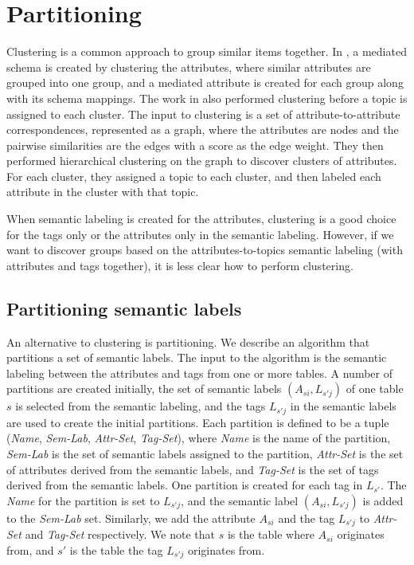\section{Partitioning}
\label{sec:Partitioning}

Clustering is a common approach to group similar items together. In \cite{ilprints851}, a mediated schema is created by clustering the attributes, where similar attributes are grouped into one group, and a mediated attribute is created for each group along with its schema mappings. The work in \cite{Smith2011Unity} also performed clustering before a topic is assigned to each cluster. The input to clustering is a set of attribute-to-attribute correspondences, represented as a graph, where the attributes are nodes and the pairwise similarities are the edges with a score as the edge weight. They then performed hierarchical clustering on the graph to discover clusters of attributes. For each cluster, they assigned a topic to each cluster, and then labeled each attribute in the cluster with that topic.

When semantic labeling is created for the attributes, clustering is a good choice for the tags only or the attributes only in the semantic labeling. However, if we want to discover groups based on the attributes-to-topics semantic labeling (with attributes and tags together), it is less clear how to perform clustering.

\subsection{Partitioning semantic labels}
\label{ssec:PartitioningSemanticLabels}

An alternative to clustering is partitioning. We describe an algorithm that partitions a set of semantic labels. The input to the algorithm is the semantic labeling between the attributes and tags from one or more tables. A number of partitions are created initially, the set of semantic labels $(A_{si}, L_{s'j})$ of one table $s$ is selected from the semantic labeling, and the tags $L_{s'j}$ in the semantic labels are used to create the initial partitions. Each partition is defined to be a tuple (\textit{Name}, \textit{Sem-Lab}, \textit{Attr-Set}, \textit{Tag-Set}), where \textit{Name} is the name of the partition, \textit{Sem-Lab} is the set of semantic labels assigned to the partition, \textit{Attr-Set} is the set of attributes derived from the semantic labels, and \textit{Tag-Set} is the set of tags derived from the semantic labels. One partition is created for each tag in $L_{s'}$. The \textit{Name} for the partition is set to $L_{s'j}$, and the semantic label $(A_{si}, L_{s'j})$ is added to the \textit{Sem-Lab} set. Similarly, we add the attribute $A_{si}$ and the tag $L_{s'j}$ to \textit{Attr-Set} and \textit{Tag-Set} respectively. We note that $s$ is the table where $A_{si}$ originates from, and $s'$ is the table the tag $L_{s'j}$ originates from.

